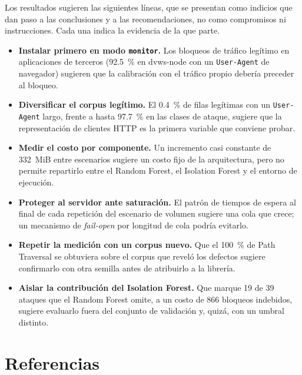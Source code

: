 Los resultados sugieren las siguientes líneas, que se presentan como indicios que dan paso a las
conclusiones y a las recomendaciones, no como compromisos ni instrucciones. Cada una indica la
evidencia de la que parte.
\begin{itemize}
    \item \textbf{Instalar primero en modo \texttt{monitor}.} Los bloqueos de tráfico legítimo en
    aplicaciones de terceros (92.5~\% en dvws-node con un \texttt{User-Agent} de navegador) sugieren
    que la calibración con el tráfico propio debería preceder al bloqueo.
    \item \textbf{Diversificar el corpus legítimo.} El 0.4~\% de filas legítimas con un
    \texttt{User-Agent} largo, frente a hasta 97.7~\% en las clases de ataque, sugiere que la
    representación de clientes HTTP es la primera variable que conviene probar.
    \item \textbf{Medir el costo por componente.} Un incremento casi constante de 332~MiB entre
    escenarios sugiere un costo fijo de la arquitectura, pero no permite repartirlo entre el Random
    Forest, el Isolation Forest y el entorno de ejecución.
    \item \textbf{Proteger al servidor ante saturación.} El patrón de tiempos de espera al final de
    cada repetición del escenario de volumen sugiere una cola que crece; un mecanismo de
    \textit{fail-open} por longitud de cola podría evitarlo.
    \item \textbf{Repetir la medición con un corpus nuevo.} Que el 100~\% de Path Traversal se
    obtuviera sobre el corpus que reveló los defectos sugiere confirmarlo con otra semilla antes de
    atribuirlo a la librería.
    \item \textbf{Aislar la contribución del Isolation Forest.} Que marque 19 de 39 ataques que el
    Random Forest omite, a un costo de 866 bloqueos indebidos, sugiere evaluarlo fuera del conjunto
    de validación y, quizá, con un umbral distinto.
\end{itemize}

\ifdefined\modoensamble
\else
	\section*{Referencias}
	\printbibliography[heading=none]
	
\fi
